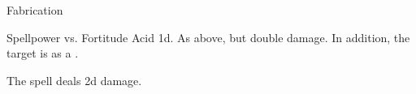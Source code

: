 \begin{spellsection}{Fabrication}
\begin{spellheader}
\end{spellheader}
\begin{spellcontent}
\begin{spelltargetinginfo}
\end{spelltargetinginfo}
\begin{spelleffects}
\begin{spellattack}{Spellpower vs. Fortitude}
\spellsuccess
Acid  \plus1d.
\spellcritical
As above, but double damage.
In addition, the target is  as a .
\end{spellattack}
\end{spelleffects}
\end{spellcontent}
\begin{spellfooter}
\end{spellfooter}
\begin{spellsubcontent}
\begin{spellcantrip}
The spell deals \minus2d damage.
\end{spellcantrip}
\end{spellsubcontent}
\end{spellsection}
